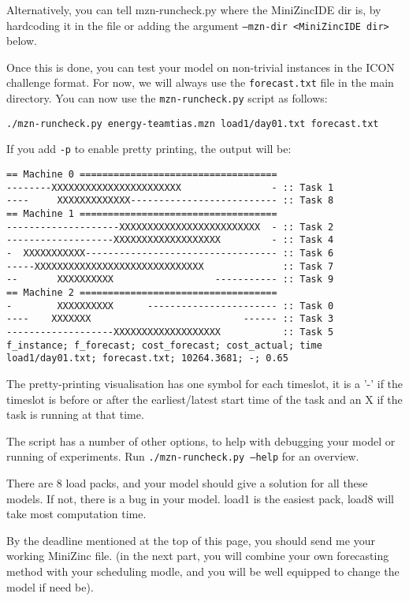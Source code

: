 \documentclass[a4,12pt]{article}
\begin{document}
Alternatively, you can tell mzn-runcheck.py where the MiniZincIDE dir is, by hardcoding it in the file or adding the argument \texttt{--mzn-dir <MiniZincIDE dir>} below.

Once this is done, you can test your model on non-trivial instances in the ICON challenge format. For now, we will always use the \texttt{forecast.txt} file in the main directory. You can now use the \texttt{mzn-runcheck.py} script as follows:
{\small
\begin{verbatim}
./mzn-runcheck.py energy-teamtias.mzn load1/day01.txt forecast.txt
\end{verbatim}
}

If you add \texttt{-p} to enable pretty printing, the output will be:
\begin{verbatim}
== Machine 0 ===================================
--------XXXXXXXXXXXXXXXXXXXXXXX                - :: Task 1
----     XXXXXXXXXXXXX-------------------------- :: Task 8
== Machine 1 ===================================
--------------------XXXXXXXXXXXXXXXXXXXXXXXXX  - :: Task 2
-------------------XXXXXXXXXXXXXXXXXXX         - :: Task 4
-  XXXXXXXXXXX---------------------------------- :: Task 6
-----XXXXXXXXXXXXXXXXXXXXXXXXXXXXXX              :: Task 7
--       XXXXXXXXXX                  ----------- :: Task 9
== Machine 2 ===================================
-        XXXXXXXXXX      ----------------------- :: Task 0
----    XXXXXXX                           ------ :: Task 3
-------------------XXXXXXXXXXXXXXXXXXX           :: Task 5
f_instance; f_forecast; cost_forecast; cost_actual; time
load1/day01.txt; forecast.txt; 10264.3681; -; 0.65
\end{verbatim}

The pretty-printing visualisation has one symbol for each timeslot, it is a '-' if the timeslot is before or after the earliest/latest start time of the task and an X if the task is running at that time.

The script has a number of other options, to help with debugging your model or running of experiments. Run \texttt{./mzn-runcheck.py --help} for an overview.

There are 8 load packs, and your model should give a solution for all these models. If not, there is a bug in your model. load1 is the easiest pack, load8 will take most computation time.

By the deadline mentioned at the top of this page, you should send me your working MiniZinc file. (in the next part, you will combine your own forecasting method with your scheduling modle, and you will be well equipped to change the model if need be). 
\end{document}
